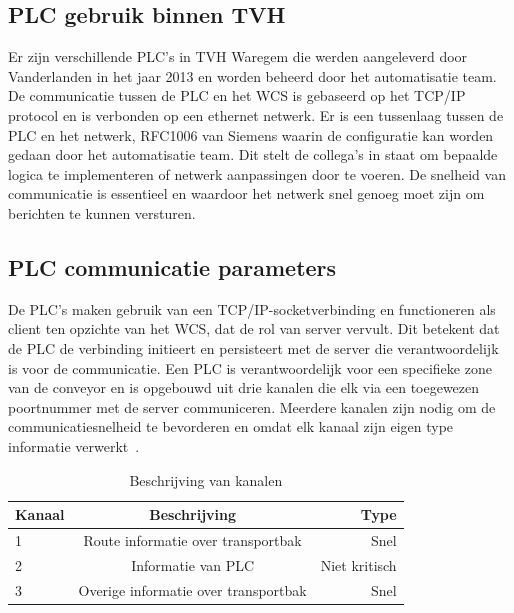 \subsection{PLC gebruik binnen TVH}
Er zijn verschillende PLC's in TVH Waregem die werden aangeleverd door Vanderlanden in het jaar 2013 en worden beheerd door het automatisatie team.
De communicatie tussen de PLC en het WCS is gebaseerd op het TCP/IP protocol en is verbonden op een ethernet netwerk.
Er is een tussenlaag tussen de PLC en het netwerk, RFC1006 van Siemens waarin de configuratie kan worden gedaan door het automatisatie team.
Dit stelt de collega's in staat om bepaalde logica te implementeren of netwerk aanpassingen door te voeren.
De snelheid van communicatie is essentieel en waardoor het netwerk snel genoeg moet zijn om berichten te kunnen versturen.

\subsection{PLC communicatie parameters}
De PLC's maken gebruik van een TCP/IP-socketverbinding en functioneren als client ten opzichte van het WCS, dat de rol van server vervult. 
Dit betekent dat de PLC de verbinding initieert en persisteert met de server die verantwoordelijk is voor de communicatie.
Een PLC is verantwoordelijk voor een specifieke zone van de conveyor en is opgebouwd uit drie kanalen die elk via een toegewezen poortnummer met de server communiceren. 
Meerdere kanalen zijn nodig om de communicatiesnelheid te bevorderen en omdat elk kanaal zijn eigen type informatie verwerkt~\autocite{Laar2013}.

\begin{table}
    \centering
    \begin{tabular}{lcr}
      \toprule
      \textbf{Kanaal} & \textbf{Beschrijving} & \textbf{Type}                \\
      \midrule
      1                & Route informatie over transportbak          & Snel           \\
      2                & Informatie van PLC                          & Niet kritisch  \\
      3                & Overige informatie over transportbak        & Snel           \\
      \bottomrule
    \end{tabular}
    \caption[Channel assignment]{\label{tab:channel-assignment}Beschrijving van kanalen}
  \end{table}

